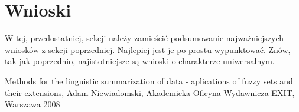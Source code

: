 \documentclass{classrep}
\begin{document}
\section{Wnioski}
{\color{blue}W tej, przedostatniej, sekcji należy zamieścić podsumowanie
najważniejszych wniosków z sekcji poprzedniej. Najlepiej jest je po prostu
wypunktować. Znów, tak jak poprzednio, najistotniejsze są wnioski o
charakterze uniwersalnym.}


\begin{thebibliography}{}
Methods for the linguistic summarization of data - aplications of fuzzy sets and their extensions, Adam Niewiadomski, Akademicka Oficyna Wydawnicza EXIT, Warszawa 2008
\end{thebibliography}
\end{document}

